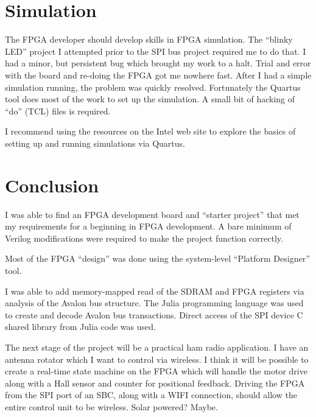 \section{Simulation}

The FPGA developer should develop skills in FPGA simulation.  The ``blinky LED'' project I attempted prior to the SPI bus project required me to do that.
I had a minor, but persistent bug which brought my work to a halt.  Trial and error with the board and re-doing the FPGA got me nowhere fast.  After I had a simple simulation running, the problem was quickly resolved.
Fortunately the Quartus tool does most of the work to set up the simulation.  A small bit of hacking of ``do'' (TCL) files is required.

I recommend using the resources on the Intel web site to explore the basics of setting up and running simulations via Quartus.

\section{Conclusion}

I was able to find an FPGA development board and ``starter project'' that met my requirements for a beginning in FPGA development.
A bare minimum of Verilog modifications were required to make the project function correctly.

Most of the FPGA ``design'' was done using the system-level ``Platform Designer'' tool.

I was able to add memory-mapped read of the SDRAM and FPGA registers via analysis of the Avalon bus structure.  The Julia programming
language was used to create and decode Avalon bus transactions.  Direct access of the SPI device C shared library from Julia code was used.

The next stage of the project will be a practical ham radio application.  I have an antenna rotator which I want to control via wireless.
I think it will be possible to create a real-time state machine on the FPGA which will handle the motor drive along with a Hall sensor
and counter for positional feedback.  Driving the FPGA from the SPI port of an SBC, along with a WIFI connection, should allow the entire
control unit to be wireless.  Solar powered?  Maybe.


